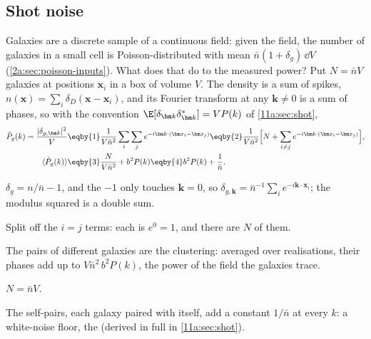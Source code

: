 \subsection{Shot noise}

Galaxies are a discrete sample of a continuous field: given the field, the number of galaxies in a small cell is Poisson-distributed with mean $\bar n(1+\delta_g)\,\dd V$ (\cref{2a:sec:poisson-inputs}). What does that do to the measured power? Put $N=\bar nV$ galaxies at positions $\bm x_i$ in a box of volume $V$. The density is a sum of spikes, $n(\bm x)=\sum_i\delta_D(\bm x-\bm x_i)$, and its Fourier transform at any $\bm k\ne0$ is a sum of phases, so with the convention $\E[\delta_{\bm k}\delta^*_{\bm k}]=VP(k)$ of \cref{11a:sec:shot},
\begin{align}
  \hat P_g(k)=\frac{|\delta_{g,\bm k}|^2}{V}
  &\eqby{1}\frac{1}{V\bar n^2}\sum_i\sum_je^{-i\bm k\cdot(\bm x_i-\bm x_j)}
  \eqby{2}\frac{1}{V\bar n^2}\Big[N+\sum_{i\ne j}e^{-i\bm k\cdot(\bm x_i-\bm x_j)}\Big],\nonumber\\
  \langle\hat P_g(k)\rangle
  &\eqby{3}\frac{N}{V\bar n^2}+b^2P(k)
  \eqby{4}b^2P(k)+\frac1{\bar n}.
  \label{T2b:eq:shot}
\end{align}
\begin{explain}
  \item $\delta_g=n/\bar n-1$, and the $-1$ only touches $\bm k=0$, so $\delta_{g,\bm k}=\bar n^{-1}\sum_ie^{-i\bm k\cdot\bm x_i}$; the modulus squared is a double sum.
  \item Split off the $i=j$ terms: each is $e^0=1$, and there are $N$ of them.
  \item The pairs of different galaxies are the clustering: averaged over realisations, their phases add up to $V\bar n^2\,b^2P(k)$, the power of the field the galaxies trace.
  \item $N=\bar nV$.
\end{explain}
The self-pairs, each galaxy paired with itself, add a constant $1/\bar n$ at every $k$: a white-noise floor, the  (derived in full in \cref{11a:sec:shot}).

